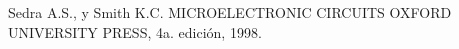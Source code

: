 \begin{thebibliography}{9}
Sedra A.S., y Smith K.C. MICROELECTRONIC CIRCUITS 
OXFORD UNIVERSITY PRESS, 4a. edición, 1998.
\end{thebibliography}

